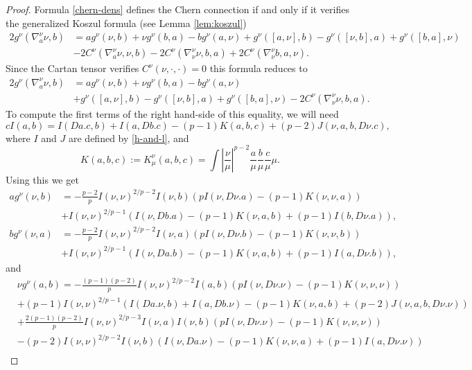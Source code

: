\documentclass[11pt]{amsart}
\theoremstyle{definition}
\newcommand{\Abs}[1]{\left|#1\right|}
\begin{document}
\begin{proof}
Formula \eqref{chern-dens} defines the Chern connection if and only if it verifies the generalized Koszul formula (see Lemma \ref{lem:koszul})
\begin{align*}
2g^\nu(\nabla^\nu_a\nu, b) &= ag^\nu(\nu, b)+\nu g^\nu(b, a) - bg^\nu(a,\nu) + g^\nu([a,\nu],b) - g^\nu([\nu,b],a) + g^\nu([b,a],\nu)\\
&-2C^\nu(\nabla^\nu_a\nu, \nu, b) - 2C^\nu(\nabla^\nu_\nu\nu, b, a) + 2C^\nu(\nabla^\nu_\nu b,a,\nu).
\end{align*}
Since the Cartan tensor verifies $C^\nu(\nu,\cdot,\cdot)=0$ this formula reduces to
\begin{equation}\label{koszul2}
\begin{aligned}
2g^\nu(\nabla^\nu_a\nu, b) &= ag^\nu(\nu, b)+\nu g^\nu(b, a) - bg^\nu(a,\nu) \\
&+ g^\nu([a,\nu],b) - g^\nu([\nu,b],a) + g^\nu([b,a],\nu) -2C^\nu(\nabla^\nu_\nu\nu, b, a).
\end{aligned}
\end{equation}
To compute the first terms of the right hand-side of this equality, we will need 
$$cI(a,b)=I(D a.c,b)+I(a,D b.c)-(p-1)K(a,b,c)+(p-2)J(\nu,a,b,D \nu.c),$$
where $I$ and $J$ are defined by \eqref{h-and-l}, and
$$K(a,b,c):=K^\nu_\mu(a,b,c)=\int \Abs{\frac{\nu}{\mu}}^{p-2}\frac{a}{\mu}\frac{b}{\mu}\frac{c}{\mu}\mu.$$
Using this we get
\begin{align*}
ag^\nu(\nu,b)&=-\frac{p-2}{p}I(\nu,\nu)^{2/p-2}I(\nu,b)\left(pI(\nu,D\nu.a)-(p-1)K(\nu,\nu,a)\right)\\
&+I(\nu,\nu)^{2/p-1}\left(I(\nu,D b.a)-(p-1)K(\nu,a,b)+(p-1)I(b,D\nu.a)\right),\\
bg^\nu(\nu,a)&=-\frac{p-2}{p}I(\nu,\nu)^{2/p-2}I(\nu,a)\left(pI(\nu,D\nu.b)-(p-1)K(\nu,\nu,b)\right)\\
&+I(\nu,\nu)^{2/p-1}\left(I(\nu,D a.b)-(p-1)K(\nu,a,b)+(p-1)I(a,D\nu.b)\right),
\end{align*}
and
\begin{align*}
&\nu g^\nu(a,b)=-\frac{(p-1)(p-2)}{p}I(\nu,\nu)^{2/p-2}I(a,b)\left(pI(\nu,D\nu.\nu)-(p-1)K(\nu,\nu,\nu)\right)\\
&+(p-1)I(\nu,\nu)^{2/p-1}\left(I(D a.\nu,b)+I(a,D b.\nu)-(p-1)K(\nu,a,b)+(p-2)J(\nu,a,b,D\nu.\nu)\right)\\
&+\frac{2(p-1)(p-2)}{p}I(\nu,\nu)^{2/p-3}I(\nu,a)I(\nu,b)\left(pI(\nu,D\nu.\nu)-(p-1)K(\nu,\nu,\nu)\right)\\
&-(p-2)I(\nu,\nu)^{2/p-2}I(\nu,b)\left(I(\nu,D a.\nu) - (p-1)K(\nu,\nu,a) + (p-1)I(a,D\nu.\nu)\right)\\

\end{align*}
\end{proof}
\end{document}
